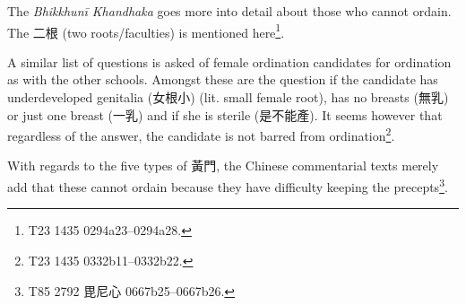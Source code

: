 The {\em Bhikkhunī Khandhaka} goes more into detail about those who cannot ordain. The 二根 (two roots/faculties) is mentioned here\footnote{T23 1435 0294a23–0294a28.}. 

A similar list of questions is asked of female ordination candidates for ordination as with the other schools. Amongst these are the question if the candidate has underdeveloped genitalia (女根小) (lit. small female root), has no breasts (無乳) or just one breast (一乳) and if she is sterile (是不能產). It seems however that regardless of the answer, the candidate is not barred from ordination\footnote{T23 1435 0332b11–0332b22.}.

With regards to the five types of 黃門, the Chinese commentarial texts merely add that these cannot ordain because they have difficulty keeping the precepts\footnote{T85 2792 毘尼心 0667b25–0667b26.}.
